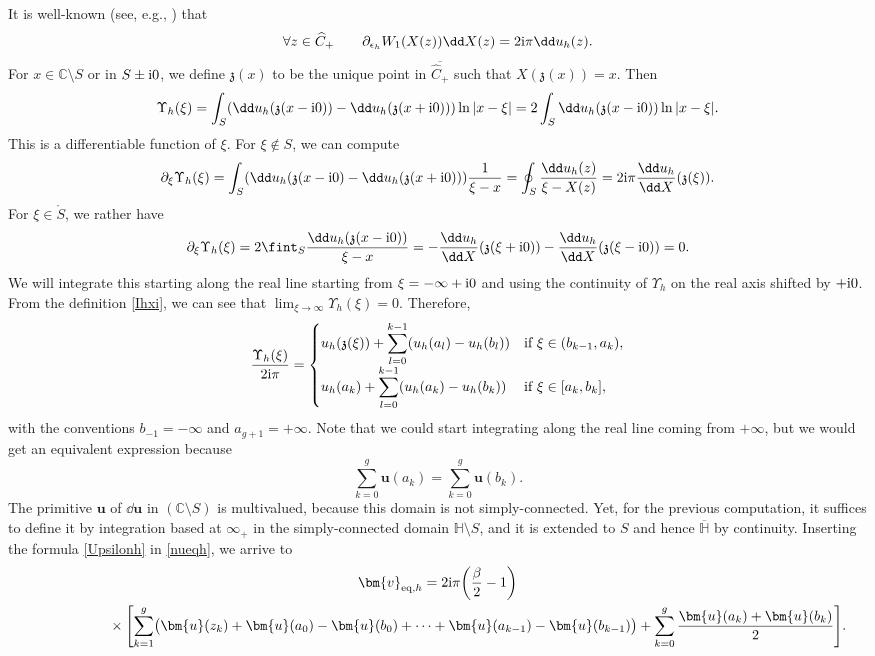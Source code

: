\documentclass[10pt,a4paper]{amsart}
\numberwithin{equation}{section}
\begin{document}
It is well-known (see, e.g., \cite[Appendix A]{BGmulti}) that
\[
\forall z \in \widehat{C}_+\qquad \partial_{\epsilon_h} W_1(X(z))\dd X(z) = 2{\rm i}\pi \dd u_h(z).
\]
For $x \in \mathbb{C} \setminus S$ or in $S \pm {\rm i}0$, we define $\mathfrak{z}(x)$ to be the unique point in $\overline{\widehat{C}_+}$ such that $X(\mathfrak{z}(x)) = x$. Then
\[
\Upsilon_h(\xi) = \int_{S}  (\dd u_h(\mathfrak{z}(x - {\rm i}0)) - \dd u_h(\mathfrak{z}(x + {\rm i}0)) ) \ln|x - \xi| = 2\int_{S} \dd u_h(\mathfrak{z}(x - {\rm i}0)) \ln|x - \xi|.
\]
This is a differentiable function of $\xi$. For $\xi \notin S$, we can compute
\[
\partial_{\xi} \Upsilon_h(\xi) = \int_{S}  (\dd u_h(\mathfrak{z}(x - {\rm i}0) - \dd u_h(\mathfrak{z}(x + {\rm i}0)) ) \frac{1}{\xi - x} = \oint_{S} \frac{\dd u_h(z)}{\xi - X(z)} = 2{\rm i}\pi \frac{\dd u_h}{\dd X}(\mathfrak{z}(\xi)).
\]
For $\xi \in \mathring{S}$, we rather have
\[
\partial_{\xi} \Upsilon_h(\xi) = 2 \fint_{S} \frac{\dd u_h(\mathfrak{z}(x - {\rm i}0))}{\xi - x} = -\frac{\dd u_h}{\dd X}(\mathfrak{z}(\xi + {\rm i}0)) - \frac{\dd u_h}{\dd X}(\mathfrak{z}(\xi - {\rm i}0)) = 0.
\]
We will integrate this starting along the real line starting from $\xi = - \infty + {\rm i}0$ and using the continuity of $\Upsilon_h$ on the real axis shifted by $+{\rm i}0$. From the definition \eqref{Ihxi}, we can see that $\lim_{\xi \rightarrow \infty} \Upsilon_h(\xi) = 0$. Therefore,
\begin{equation}
\label{Upsilonh}
\frac{\Upsilon_h(\xi)}{2{\rm i}\pi} = \begin{cases}\displaystyle u_h(\mathfrak{z}(\xi)) + \sum_{l = 0}^{k - 1}  (u_h(a_l) - u_h(b_l) ) & \text{if} \ \xi \in (b_{k - 1},a_k), \\
\displaystyle u_h(a_k) + \sum_{l = 0}^{k- 1}  (u_h(a_k) - u_h(b_k) ) & \text{if} \ \xi \in [a_k,b_k], \end{cases}
\end{equation}
with the conventions $b_{-1} = -\infty$ and $a_{g + 1} = +\infty$. Note that we could start integrating along the real line coming from $+\infty$, but we would get an equivalent expression because
\begin{equation*}
\sum_{k = 0}^{g} \bm{u}(a_k) = \sum_{k = 0}^{g} \bm{u}(b_k).
\end{equation*}
The primitive $\bm{u}$ of $\dd \bm{u}$ in $(\mathbb{C} \setminus S)$ is multivalued, because this domain is not simply-connected. Yet, for the previous computation, it suffices to define it by integration based at $\infty_+$ in the simply-connected domain $\mathbb{H} \setminus S$, and it is extended to $S$ and hence $\overline{\mathbb{H}}$ by continuity. Inserting the formula \eqref{Upsilonh} in \eqref{nueqh}, we arrive to
\begin{gather}
\bm{v}_{{\rm eq},h} = 2{\rm i}\pi \biggl(\frac{\beta}{2} - 1\biggr)\label{sumv}\\
\hphantom{\bm{v}_{{\rm eq},h} =}{}
\times\Biggl[\sum_{k = 1}^{g} \bigl(\bm{u}(z_k) + \bm{u}(a_0) - \bm{u}(b_0) + \cdots + \bm{u}(a_{k - 1}) - \bm{u}(b_{k - 1})\bigr) + \sum_{k = 0}^g \frac{\bm{u}(a_k) + \bm{u}(b_k)}{2}\Biggr].\nonumber
\end{gather}
\end{document}
